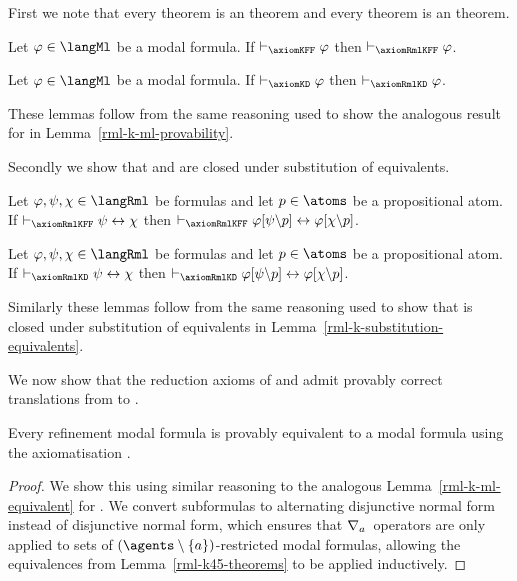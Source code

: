 First we note that every \axiomKFF{} theorem is an \axiomRmlKFF{} theorem and every \axiomKD{} theorem is an \axiomRmlKD{} theorem.

\begin{lemma}\label{rml-k45-ml-provability}
Let $\phi \in \langMl$ be a modal formula.
If $\proves_\axiomKFF \phi$ then $\proves_\axiomRmlKFF \phi$.
\end{lemma}

\begin{lemma}\label{rml-kd45-ml-provability}
Let $\phi \in \langMl$ be a modal formula.
If $\proves_\axiomKD \phi$ then $\proves_\axiomRmlKD \phi$.
\end{lemma}

These lemmas follow from the same reasoning used to show the analogous result for \axiomRmlK{} in Lemma~\ref{rml-k-ml-provability}.

Secondly we show that \axiomRmlKFF{} and \axiomRmlKD{} are closed under substitution of equivalents.

\begin{lemma}\label{rml-k45-substitution-equivalents}
Let $\phi, \psi, \chi \in \langRml$ be formulas and let $\atomP \in \atoms$ be a propositional atom.
If $\proves_\axiomRmlKFF \psi \iff \chi$ then $\proves_\axiomRmlKFF \phi[\psi\backslash\atomP] \iff \phi[\chi\backslash\atomP]$.
\end{lemma}

\begin{lemma}\label{rml-kd45-substitution-equivalents}
Let $\phi, \psi, \chi \in \langRml$ be formulas and let $\atomP \in \atoms$ be a propositional atom.
If $\proves_\axiomRmlKD \psi \iff \chi$ then $\proves_\axiomRmlKD \phi[\psi\backslash\atomP] \iff \phi[\chi\backslash\atomP]$.
\end{lemma}

Similarly these lemmas follow from the same reasoning used to show that \axiomRmlK{} is closed under substitution of equivalents in Lemma~\ref{rml-k-substitution-equivalents}.

We now show that the reduction axioms of \logicRmlKFF{} and \logicRmlKD{} admit provably correct translations from \langRml{} to \langMl{}.

\begin{lemma}\label{rml-k45-ml-equivalent}
Every refinement modal formula is provably equivalent to a modal formula using the axiomatisation \axiomRmlKFF{}.
\end{lemma}

\begin{proof}
We show this using similar reasoning to the analogous Lemma~\ref{rml-k-ml-equivalent} for \axiomRmlK{}.
We convert subformulas to alternating disjunctive normal form instead of disjunctive normal form, which ensures that $\nabla_{a}$~operators are only applied to sets of $(\agents \setminus \{\agentA\})$-restricted modal formulas, allowing the equivalences from Lemma~\ref{rml-k45-theorems} to be applied inductively.
\end{proof}

